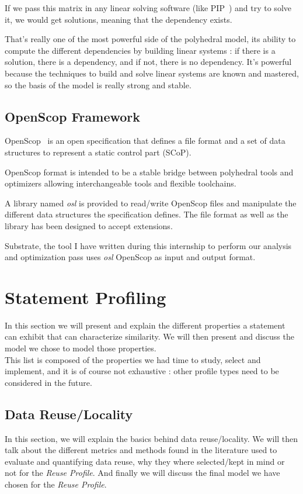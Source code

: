 \documentclass[paper=a4, fontsize=11.5pt]{scrartcl}
\numberwithin{equation}{section}        %
\numberwithin{figure}{section}          %
\numberwithin{table}{section}               %
\begin{document}
    If we pass this matrix in any linear solving software (like PIP~\cite{Fea88}) and try to solve it,
    we would get solutions, meaning that the dependency exists.

    \bigskip

    That's really one of the most powerful side of the polyhedral model, its ability to
    compute the different dependencies by building linear systems : if there is a solution,
    there is a dependency, and if not, there is no dependency. It's powerful because
    the techniques to build and solve linear systems are known and mastered, so the basis
    of the model is really strong and stable. 


    \subsection{OpenScop Framework}
        OpenScop~\cite{openscop} is an open specification that defines a file format
        and a set of data structures to represent a static control part (SCoP).

        OpenScop format is intended to be a stable bridge between polyhedral tools
        and optimizers allowing interchangeable tools and flexible toolchains.

        A library named \textit{osl} is provided to read/write OpenScop files
        and manipulate the different data structures the specification defines.
        The file format as well as the library has been designed to accept extensions.

        Substrate, the tool I have written during this internship to perform our analysis
        and optimization pass uses \textit{osl} OpenScop as input and output format.

\section{Statement Profiling}
In this section we will present and explain the different properties a statement can exhibit
that can characterize similarity. We will then present and discuss the model we chose to model
those properties.\\
This list is composed of the properties we had time to study, select and implement,
and it is of course not exhaustive : other profile types need to be considered in the future.
\label{sec:statement_profiling}
    \subsection{Data Reuse/Locality}
        In this section, we will explain the basics behind data reuse/locality. We will then
        talk about the different metrics and methods found in the literature used to evaluate
        and quantifying data reuse, why they where selected/kept in mind or not for the \textit{Reuse Profile}.
        And finally we will discuss the final model we have chosen for the \textit{Reuse Profile}.
\end{document}
